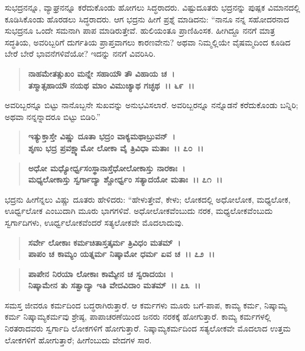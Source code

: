 ಸುಭದ್ರನನ್ನೂ, ವ್ಯಾಘ್ರನನ್ನೂ ಕರೆದುಕೊಂಡು ಹೋಗಲು ಸಿದ್ಧರಾದರು. ವಿಷ್ಟುದೂತರು ಭದ್ರನನ್ನು ಪುಷ್ಪಕ ವಿಮಾನದಲ್ಲಿ ಕೂಡಿಸಿಕೊಂಡು ಹೊರಡಲು ಸಿದ್ಧರಾದರು. ಆಗ ಭದ್ರನು ಹೀಗೆ ಪ್ರಶ್ನೆ ಮಾಡಿದನು: “ನಾನೂ ನನ್ನ ಸಹೋದರನಾದ ಸುಭದ್ರನೂ ಒಂದೇ ಸಮನಾಗಿ ಪಾಪ ಮಾಡಿರುತ್ತೇವೆ. ಹುಲಿಯಂತೂ ಪ್ರಾಣಿಹಿಂಸಕ. ಹೀಗಿದ್ದೂ ನನಗೆ ಮಾತ್ರ ಸದ್ಧತಿಯ, ಅವರಿಬ್ಬರಿಗೆ ದುರ್ಗತಿಯ ಪ್ರಾಪ್ತವಾಗಲು ಕಾರಣವೇನು? ಅಥವಾ ನಿಮ್ಮಲ್ಲಿಯೇ ವೈಷಮ್ಮದಿಂದ ಕೂಡಿದ ಬೇರೆ ಬೇರೆ ಭಾವನೆಗಳಿವೆಯೋ? ಇದನ್ನು ನನಗೆ ವಿವರಿಸಿರಿ.

\begin{verse}
\textbf{ನಾಹಮೇತತ್ಸುಖಂ ಮನ್ನೇ ಸಹಾಯೌ ತೌ ವಿಹಾಯ ಚ~।}\\\textbf{ತಸ್ಮಾತ್ಸಹಾಯೌ ನಯಥ ಮಾಂ ವಿಮುಚ್ಯಾಥ ಗಚ್ಛಥ~।। ೬೯~।।}
\end{verse}

ಅವರಿಬ್ಬರನ್ನೂ ಬಿಟ್ಟು ನಾನೊಬ್ಬನೇ ಸುಖವನ್ನು ಅನುಭವಿಸಲಾರೆ. ಅವರಿಬ್ಬರನ್ನೂ ನನ್ನೊಡನೆ ಕರೆದುಕೊಂಡು ಬನ್ನಿರಿ; ಅಥವಾ ನನ್ನನ್ನಾದರೂ ಬಿಟ್ಟು ಬಿಡಿರಿ.”

\begin{verse}
\textbf{ಇತ್ಯುಕ್ತಾಸ್ತೇ ವಿಷ್ಣು ದೂತಾ ಭದ್ರಂ ವಾಕ್ಯಮಥಾಬ್ರುವನ್~।}\\\textbf{ಶೃಣು ಭದ್ರ ಪ್ರವಕ್ಷ್ಯಾಮೋ ಲೋಕಾ ವೈ ತ್ರಿವಿಧಾ ಮತಾಃ~।। ೭೦~।। }
\end{verse}

\begin{verse}
\textbf{ಅಧೋ ಮಧ್ಯೋರ್ಧ್ವಸಂಸ್ಥಾನಾಸ್ತೆಧೋಲೋಕಾಸ್ತು ನಾರಕಾಃ~।}\\\textbf{ಮಧ್ಯಲೋಕಾಸ್ತು ಸ್ವರ್ಗಾದ್ಯಾ ಶ್ಚೋರ್ಧ್ವಂ ಸತ್ಯಾದಯೋ ಮತಾಃ~।। ೭೧~।।}
\end{verse}

ಭದ್ರನು ಹೀಗೆನ್ನಲು ವಿಷ್ಣು ದೂತರು ಹೇಳಿದರು: “ಹೇಳುತ್ತೇವೆ, ಕೇಳು; ಲೋಕದಲ್ಲಿ ಅಧೋಲೋಕ, ಮಧ್ಯಲೋಕ, ಊರ್ಧ್ವಲೋಕ ಎಂಬುದಾಗಿ ಮೂರು ಭಾಗಗಳಿವೆ. ಅಧೋಲೋಕವೆಂಬುದು ನರಕ, ಮಧ್ಯಲೋಕವೆಂಬುದು ಸ್ವರ್ಗಾದಿಗಳು, ಊರ್ಧ್ವಲೋಕವೆಂದರೆ ಸತ್ಯಲೋಕವೇ ಮೊದಲಾದುವು.

\begin{verse}
\textbf{ಸರ್ವೇ ಲೋಕಾಃ ಕರ್ಮಚಿತಾಸ್ತತ್ಕರ್ಮ ತ್ರಿವಿಧಂ ಮತಮ್~।}\\\textbf{ಪಾಪಂ ಚ ಕಾಮ್ಯಂ ಯತ್ನರ್ಮ ನಿಷ್ಕಾಮೋ ಧರ್ಮ ಏವ ಚ~।। ೭೨~।।} 
\end{verse}

\begin{verse}
\textbf{ಪಾಪೇನ ನಿರಯಾ ಲೋಕಾಃ ಕಾಮ್ಯೇನ ಚ ಸ್ವರಾದಯಃ~।}\\\textbf{ನಿಷ್ಕಾಮೇನ ತು ಸತ್ವಾದ್ಯಾ ಇತಿ ವೇದವಿದಾಂ ಮತಮ್~।। ೭೩~।।}
\end{verse}

ಸಮಸ್ತ ಜೀವರೂ ಕರ್ಮದಿಂದ ಬದ್ಧರಾಗಿರುತ್ತಾರೆ. ಆ ಕರ್ಮಗಳು ಮೂರು ಬಗೆ-ಪಾಪ, ಕಾಮ್ಯ ಕರ್ಮ, ನಿಷ್ಕಾಮ್ಯ ಕರ್ಮ ನಿಷ್ಕಾಮ್ಯಕರ್ಮವು ಶ್ರೇಷ್ಠ, ಪಾಪಾಚರಣೆಯಿಂದ ಜನರು ನರಕಕ್ಕೆ ಹೋಗುತ್ತಾರೆ. ಕಾಮ್ಯ ಕರ್ಮಗಳಲ್ಲಿ ನಿರತರಾದವರು ಸ್ವರ್ಗಾದಿ ಲೋಕಗಳಿಗೆ ಹೋಗುತ್ತಾರೆ. ನಿಷ್ಕಾಮ್ಯಕರ್ಮದಿಂದ ಸತ್ಯಲೋಕವೇ ಮೊದಲಾದ ಉತ್ತಮ ಲೋಕಗಳಿಗೆ ಹೋಗುತ್ತಾರೆ; ಹೀಗೆಂಬುದು ವೇದಗಳ ಸಾರ.

